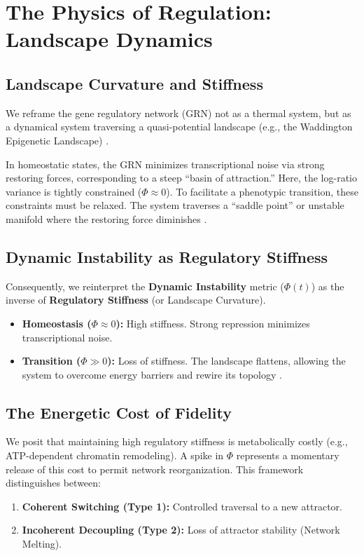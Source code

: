 \documentclass[11pt, a4paper]{article}
\begin{document}
\section{The Physics of Regulation: Landscape Dynamics}

\subsection{Landscape Curvature and Stiffness}
We reframe the gene regulatory network (GRN) not as a thermal system, but as a dynamical system traversing a quasi-potential landscape (e.g., the Waddington Epigenetic Landscape) \citep{waddington1957}.

In homeostatic states, the GRN minimizes transcriptional noise via strong restoring forces, corresponding to a steep ``basin of attraction.'' Here, the log-ratio variance is tightly constrained ($\Phi \approx 0$). To facilitate a phenotypic transition, these constraints must be relaxed. The system traverses a ``saddle point'' or unstable manifold where the restoring force diminishes \citep{ferrell2012}.

\subsection{Dynamic Instability as Regulatory Stiffness}
Consequently, we reinterpret the \textbf{Dynamic Instability} metric ($\Phi(t)$) as the inverse of \textbf{Regulatory Stiffness} (or Landscape Curvature).
\begin{itemize}
    \item \textbf{Homeostasis ($\Phi \approx 0$):} High stiffness. Strong repression minimizes transcriptional noise.
    \item \textbf{Transition ($\Phi \gg 0$):} Loss of stiffness. The landscape flattens, allowing the system to overcome energy barriers and rewire its topology \citep{scheffer2009}.
\end{itemize}

\subsection{The Energetic Cost of Fidelity}
We posit that maintaining high regulatory stiffness is metabolically costly (e.g., ATP-dependent chromatin remodeling). A spike in $\Phi$ represents a momentary release of this cost to permit network reorganization. This framework distinguishes between:
\begin{enumerate}
    \item \textbf{Coherent Switching (Type 1):} Controlled traversal to a new attractor.
    \item \textbf{Incoherent Decoupling (Type 2):} Loss of attractor stability (Network Melting).
\end{enumerate}
\end{document}
